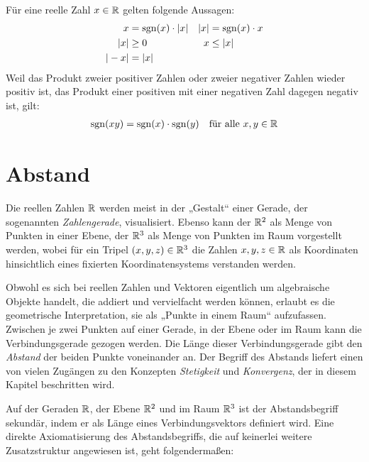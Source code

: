 \begin{bem}
    Für eine reelle Zahl $x\in \mathbb R$ gelten folgende Aussagen:
    \begin{align*}
        x & = \operatorname{sgn}(x)\cdot \vert x\vert & \vert x \vert & = \operatorname{sgn}(x)\cdot x \\
        \vert x\vert & \ge 0 & x & \le \vert x\vert \\
        \vert -x\vert & = \vert x\vert
    \end{align*}
    Weil das Produkt zweier positiver Zahlen oder zweier negativer Zahlen wieder positiv ist, das Produkt einer positiven mit einer negativen Zahl dagegen negativ ist, gilt:
    \begin{align*}
        \operatorname{sgn}(xy) = \operatorname{sgn}(x)\cdot \operatorname{sgn}(y) && \text{für alle $x,y\in \mathbb R$}
    \end{align*}
\end{bem}





\section{Abstand}


\begin{bem}
    Die reellen Zahlen $\mathbb R$ werden meist in der „Gestalt“ einer Gerade, der sogenannten \emph{Zahlengerade}, visualisiert. Ebenso kann der $\mathbb R^2$ als Menge von Punkten in einer Ebene, der $\mathbb R^3$ als Menge von Punkten im Raum vorgestellt werden, wobei für ein Tripel $(x,y,z)\in \mathbb R^3$ die Zahlen $x,y,z\in \mathbb R$ als Koordinaten hinsichtlich eines fixierten Koordinatensystems verstanden werden.
    
    Obwohl es sich bei reellen Zahlen und Vektoren eigentlich um algebraische Objekte handelt, die addiert und vervielfacht werden können, erlaubt es die geometrische Interpretation, sie als „Punkte in einem Raum“ aufzufassen. Zwischen je zwei Punkten auf einer Gerade, in der Ebene oder im Raum kann die Verbindungsgerade gezogen werden. Die Länge dieser Verbindungsgerade gibt den \emph{Abstand} der beiden Punkte voneinander an. Der Begriff des Abstands liefert einen von vielen Zugängen zu den Konzepten \emph{Stetigkeit} und \emph{Konvergenz}, der in diesem Kapitel beschritten wird.
    
    Auf der Geraden $\mathbb R$, der Ebene $\mathbb R^2$ und im Raum $\mathbb R^3$ ist der Abstandsbegriff sekundär, indem er als Länge eines Verbindungsvektors definiert wird. Eine direkte Axiomatisierung des Abstandsbegriffs, die auf keinerlei weitere Zusatzstruktur angewiesen ist, geht folgendermaßen:
\end{bem}


